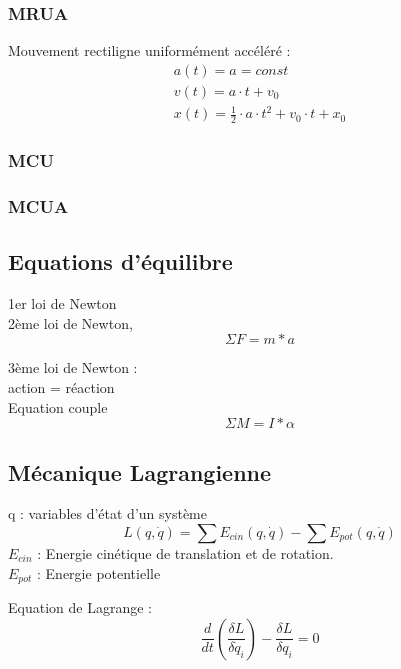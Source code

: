 \subsubsection{MRUA}
Mouvement rectiligne uniformément accéléré :
\begin{eqnarray}
a(t)=a=const\\
v(t)=a \cdot t+v_0\\
x(t)=\frac{1}{2} \cdot a \cdot t^2+v_0 \cdot t + x_0
\end{eqnarray}

\subsubsection{MCU}
\subsubsection{MCUA}


\subsection{Equations d'équilibre}
1er loi de Newton \\


2ème loi de Newton, 
\begin{equation}
\Sigma F= m*a
\end{equation}

3ème loi de Newton : \\

action = réaction \\

Equation couple
\begin{equation}
\Sigma M=I*\alpha
\end{equation}

\subsection{Mécanique Lagrangienne}
q : variables d'état d'un système
\begin{equation}
L(q,\dot{q})=\sum E_{cin}(q,\dot{q}) - \sum E_{pot}(q,\dot{q})
\end{equation}
$E_{cin}$ : Energie cinétique de translation et de rotation.\\
$E_{pot}$ : Energie potentielle

Equation de Lagrange :
\begin{equation}
\frac{d}{dt}(\frac{\delta L}{\delta \dot{q}_i})-\frac{\delta L}{\delta q_i}=0
\end{equation}


